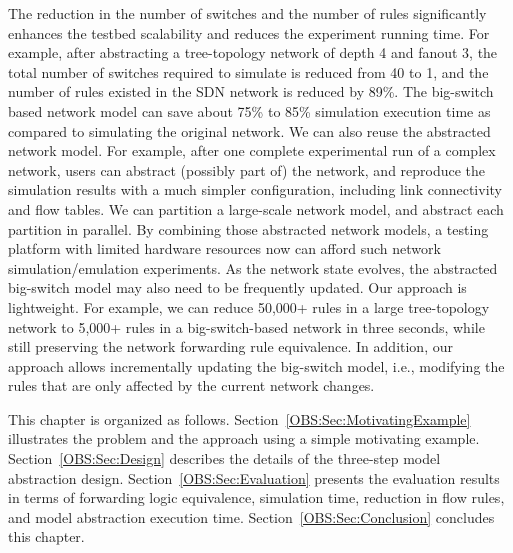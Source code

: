 The reduction in the number of switches and the number of rules significantly enhances the testbed scalability and reduces the experiment running time.
For example, after abstracting a tree-topology network of depth 4 and fanout 3,
the total number of switches required to simulate is reduced from 40 to 1, and the number of rules existed in the SDN network is reduced by 89\%.
The big-switch based network model can save about
75\% to 85\% simulation execution time as compared to simulating the original network.
We can also reuse the abstracted network model.
For example, after one complete experimental run of a complex network,
users can abstract (possibly part of) the network, and reproduce the simulation results with
a much simpler configuration, including link connectivity and flow tables.
We can partition a large-scale network model, and abstract each partition in parallel.
By combining those abstracted network models, a testing platform with limited hardware resources
now can afford such network simulation/emulation experiments.
As the network state evolves, the abstracted big-switch model may also need to be frequently updated.
Our approach is lightweight. For example, we can reduce 50,000+ rules in a large tree-topology network
to 5,000+ rules in a big-switch-based network in three seconds, 
while still preserving the network forwarding rule equivalence.
In addition, our approach allows incrementally updating the big-switch model,
i.e., modifying the rules that are only affected by the current network changes.

This chapter is organized as follows.
Section~\ref{OBS:Sec:MotivatingExample} illustrates the problem and the approach using a simple motivating example.
Section~\ref{OBS:Sec:Design} describes the details of the three-step model abstraction design.
Section~\ref{OBS:Sec:Evaluation} presents the evaluation results in terms of forwarding logic equivalence, simulation time,
reduction in flow rules, and model abstraction execution time.
Section~\ref{OBS:Sec:Conclusion} concludes this chapter.


